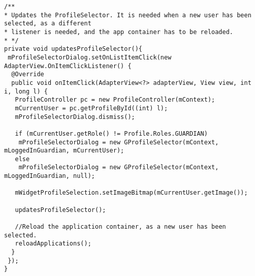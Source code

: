 \begin{lstlisting}[caption={The recursive method setting instantiating the Profile Selector with the correct arguments each time a new user is selected.}, label={lst:newprofileselectoronitemclick}]
/**
* Updates the ProfileSelector. It is needed when a new user has been selected, as a different
* listener is needed, and the app container has to be reloaded.
* */
private void updatesProfileSelector(){
 mProfileSelectorDialog.setOnListItemClick(new AdapterView.OnItemClickListener() {
  @Override
  public void onItemClick(AdapterView<?> adapterView, View view, int i, long l) {
   ProfileController pc = new ProfileController(mContext);
   mCurrentUser = pc.getProfileById((int) l);
   mProfileSelectorDialog.dismiss();
  
   if (mCurrentUser.getRole() != Profile.Roles.GUARDIAN)
    mProfileSelectorDialog = new GProfileSelector(mContext, mLoggedInGuardian, mCurrentUser);
   else
    mProfileSelectorDialog = new GProfileSelector(mContext, mLoggedInGuardian, null);
  
   mWidgetProfileSelection.setImageBitmap(mCurrentUser.getImage());
  
   updatesProfileSelector();
  
   //Reload the application container, as a new user has been selected.
   reloadApplications();
  }
 });
} 
\end{lstlisting}